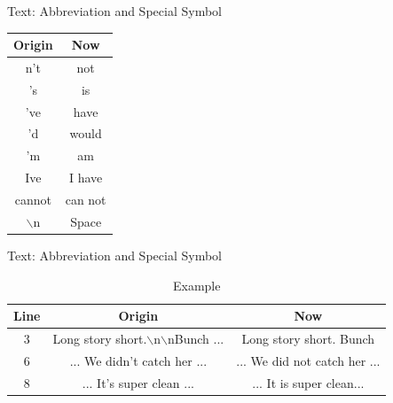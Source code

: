 \documentclass[10pt]{beamer}
\begin{document}


\begin{frame}{Text: Abbreviation and Special Symbol}

\begin{table}[ht]

\centering %
\begin{tabular}{c c} %
\hline %
Origin & Now \\ [0.5ex] %
\hline %
n't &   not\\  
's &   is\\  
've &   have\\  
'd &   would\\  
'm &   am\\  
Ive &  I have\\  
cannot &  can not\\
$\backslash$n & Space \\
\hline %
\end{tabular}
\label{table:nonlin} %
\end{table}
\end{frame}


\begin{frame}{Text: Abbreviation and Special Symbol}


\begin{table}[ht]
\caption{Example} %
\centering %
\begin{tabular}{c c c} %
\hline %
Line & Origin & Now \\ [0.5ex] %
\hline %
3 & Long story short.$\backslash$n$\backslash$nBunch ... & Long story short.  Bunch \\
6 & ... We didn't catch her ... & ... We did not catch her ...  \\  
8 & ... It's super clean ... & ... It is super clean...  \\  
\hline %
\end{tabular}
\label{table:nonlin} %
\end{table}
\end{frame}
\end{document}
